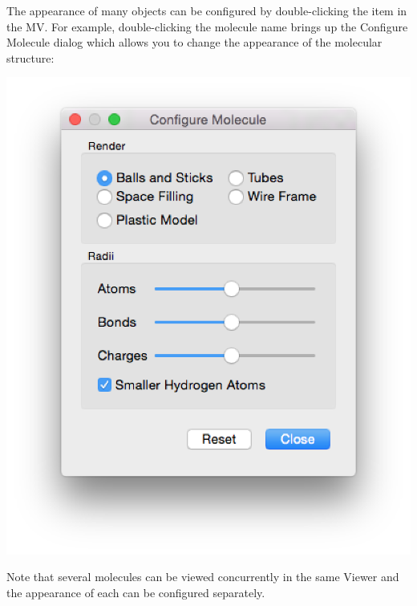 \documentclass[a4paper,12pt]{article}
\begin{document}
The appearance of many objects can be configured by double-clicking the item in
the MV.  For example, double-clicking the molecule name brings up the Configure
Molecule dialog which allows you to change the appearance of the molecular
structure:
\begin{center}
\includegraphics[scale=0.25]{figures/MoleculeConfigurator.png}
\end{center}
Note that several molecules can be viewed concurrently in the same Viewer
and the appearance of each can be configured separately.  
\end{document}
